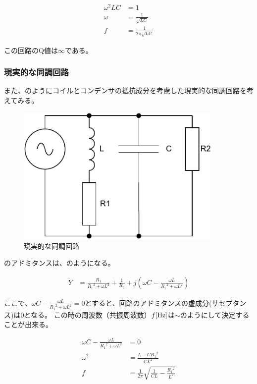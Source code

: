 \documentclass[report.tex]{subfiles}
\begin{document}
\begin{align}
	\omega^2 LC & = 1                            \label{eq:resonance2} \\
	\omega      & = \frac{1}{\sqrt{LC}}                                \\
	f           & = \frac{1}{2 \pi \sqrt{LC}} \label{eq:resonance}
\end{align}

この回路のQ値は\(\infty\)である。

\subsubsection{現実的な同調回路}\label{sec:real}

また、のようにコイルとコンデンサの抵抗成分を考慮した現実的な同調回路を考えてみる。

\begin{figure}[H]
	\centering
	\includegraphics[width=10cm]{fig/kyo2.pdf}
	\caption{現実的な同調回路}
	\label{fig:kyo2}
\end{figure}

のアドミタンスは、のようになる。

\begin{align}
	\dot{Y} & = \frac{R_1}{{R_1}^2+ {\omega L}^2} + \frac{1}{R_2} + j(\omega C - \frac{\omega L}{{R_1}^2+ {\omega L}^2})\label{eq:impedance2}
\end{align}

ここで、$\omega C - \frac{\omega L}{{R_1}^2+ {\omega L}^2} = 0$とすると、回路のアドミタンスの虚成分(サセプタンス)は0となる。
この時の周波数（共振周波数）\(f\rm{[Hz]}\)は\(\sim\)のようにして決定することが出来る。

\begin{align}
	\omega C - \frac{\omega L}{{R_1}^2+ {\omega L}^2} & = 0 \label{eq:kyousin}                                                           \\
	\omega ^2                                         & = \frac{L - {CR_1}^2}{CL^2}                                                      \\
	f                                                 & = \frac{1}{2 \pi} \sqrt{\frac{1}{CL} - {\frac{{R_1}^2}{L^2}}}\label{eq:kyousin2}
\end{align}
\end{document}
